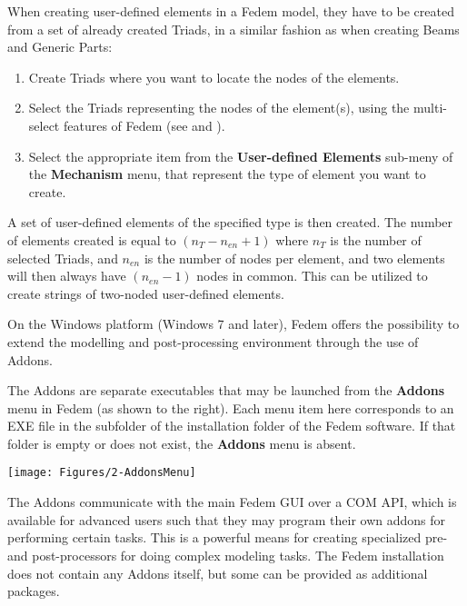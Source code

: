 When creating user-defined elements in a Fedem model, they have to be created
from a set of already created Triads, in a similar fashion as when creating
Beams and Generic Parts:

\begin{enumerate}
\item Create Triads where you want to locate the nodes of the elements.
\item Select the Triads representing the nodes of the element(s), using the
  multi-select features of Fedem (see
   and ).
\item Select the appropriate item from the \textbf{User-defined Elements}
  sub-meny of the \textbf{Mechanism} menu, that represent the type of element
  you want to create.
\end{enumerate}

\clearpage
A set of user-defined elements of the specified type is then created.
The number of elements created is equal to $(n_T-n_{en}+1)$ where $n_T$ is the
number of selected Triads, and $n_{en}$ is the number of nodes per element,
and two elements will then always have $(n_{en}-1)$ nodes in common.
This can be utilized to create strings of two-noded user-defined elements.




On the Windows platform (Windows 7 and later), Fedem offers the possibility to
extend the modelling and post-processing environment through the use of Addons.

\noindent
\begin{minipage}{0.55\textwidth}
  \raggedright
  The Addons are separate executables that may be launched from the
  \textbf{Addons} menu in Fedem (as shown to the right).
  Each menu item here corresponds to an EXE file in the  subfolder
  of the installation folder of the Fedem software. If that folder is empty or
  does not exist, the \textbf{Addons} menu is absent.
\end{minipage}%
\begin{minipage}{0.45\textwidth}
  \raggedleft
  \texttt{[image: Figures/2-AddonsMenu]}
\end{minipage}

The Addons communicate with the main Fedem GUI over a COM API,
which is available for advanced users such that they may program their own
addons for performing certain tasks. This is a powerful means for creating
specialized pre- and post-processors for doing complex modeling tasks.
The Fedem installation does not contain any Addons itself, but some can be
provided as additional packages.
